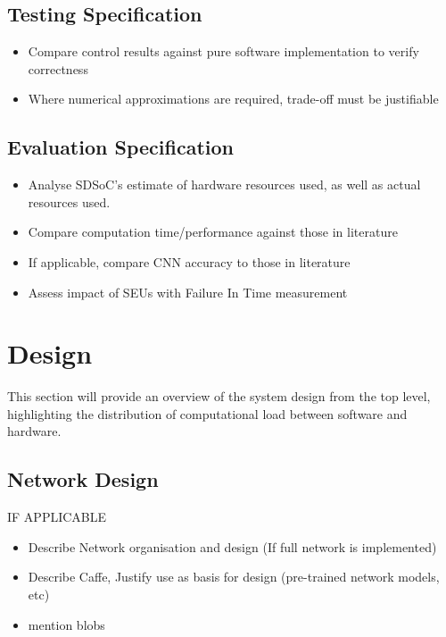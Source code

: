 \documentclass[12pt]{article}
\begin{document}
\subsection{Testing Specification}
\label{sec:ProjSpec-TestSpec}


\begin{itemize}
\item Compare control results against pure software implementation to verify correctness
\item Where numerical approximations are required, trade-off must be justifiable
\end{itemize}

\subsection{Evaluation Specification}
\label{sec:ProjSpec-EvalSpec}


\begin{itemize}
\item Analyse SDSoC's estimate of hardware resources used, as well as actual resources used.
\item Compare computation time/performance against those in literature
\item If applicable, compare CNN accuracy to those in literature
\item Assess impact of SEUs with Failure In Time measurement
\end{itemize}

\newpage

\section{Design}
\label{sec:Design}

This section will provide an overview of the system design from the top level, highlighting the distribution of computational load between software and hardware.

\subsection{Network Design}
\label{sec:Design-Network}

IF APPLICABLE
\begin{itemize}
\item Describe Network organisation and design (If full network is implemented)
\item Describe Caffe, Justify use as basis for design (pre-trained network models, etc)
\item mention blobs
\end{itemize}
\end{document}
